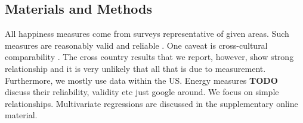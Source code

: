 \documentclass[10pt, letterpaper]{article}
\begin{document}
\begin{spacing}{1.4}





\section*{\large \bf Materials and Methods}
All happiness measures come from surveys representative of given areas. Such measures are reasonably valid and
reliable \cite{diener13b}. %
One caveat is cross-cultural comparability \cite{diener03b}. The cross
country results that we report, however, show  strong relationship and it is very
unlikely that all that is due to measurement. Furthermore, we mostly use data
within the US. Energy measures \textbf{TODO} discuss their reliability, validity etc just
google around.  We focus on simple relationships. Multivariate regressions are
discussed in the supplementary online material. 



\end{spacing}
\end{document}
